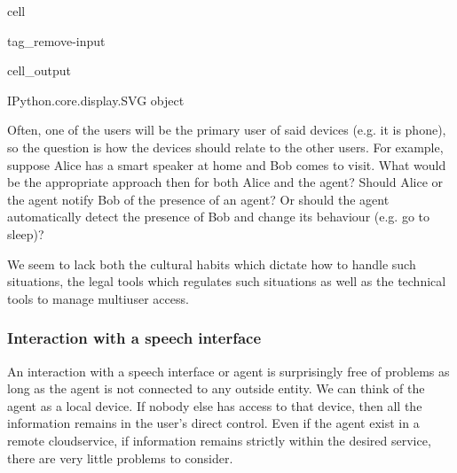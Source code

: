 \documentclass[letterpaper,10pt,english]{jupyterBook}
\begin{document}
\begin{sphinxuseclass}{cell}
\begin{sphinxuseclass}{tag_remove-input}\begin{sphinxVerbatimOutput}

\begin{sphinxuseclass}{cell_output}
\begin{sphinxVerbatim}[commandchars=\\\{\}]
\PYGZlt{}IPython.core.display.SVG object\PYGZgt{}
\end{sphinxVerbatim}

\end{sphinxuseclass}\end{sphinxVerbatimOutput}

\end{sphinxuseclass}
\end{sphinxuseclass}
\sphinxAtStartPar
Often, one of the users will be the primary user of said devices (e.g. it is  phone), so the question is how the devices should relate to the other users. For example, suppose Alice has a smart speaker at home and Bob comes to visit. What would be the appropriate approach then for both Alice and the agent? Should Alice or the agent notify Bob of the presence of an agent? Or should the agent automatically detect the presence of Bob and change its behaviour (e.g. go to sleep)?

\sphinxAtStartPar
We seem to lack both the cultural habits which dictate how to handle such situations, the legal tools which regulates such situations as well as the technical tools to manage multi\sphinxhyphen{}user access.


\subsubsection{Interaction with a speech interface}
\label{\detokenize{Security_and_privacy:interaction-with-a-speech-interface}}
\sphinxAtStartPar
An interaction with a speech interface or agent is surprisingly free of problems as long as the agent is not connected to any outside entity. We can think of the agent as a local device. If nobody else has access to that device, then all the information remains in the user’s direct control. Even if the agent exist in a remote cloud\sphinxhyphen{}service, if information remains strictly within the desired service, there are very little problems to consider.
\end{document}
